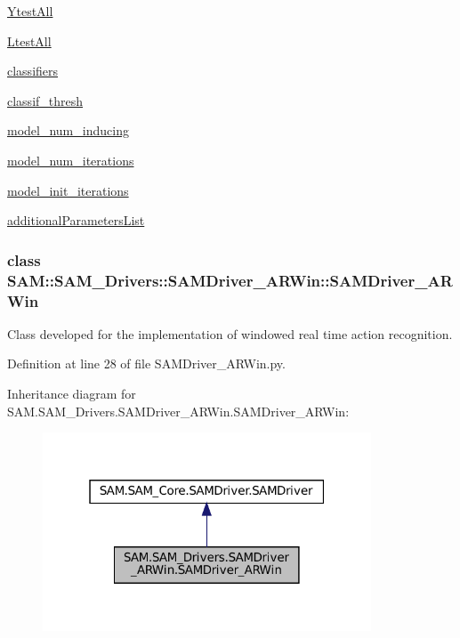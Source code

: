 \begin{DoxyCompactItemize}
\item 
\hyperlink{group__icubclient__SAM__Drivers_ga61bc4612a1dd3b5d593798bb7e338c81}{Ytest\+All}
\item 
\hyperlink{group__icubclient__SAM__Drivers_ga47bb2e79cf8b5f8e071ab6208cf25dd0}{Ltest\+All}
\item 
\hyperlink{group__icubclient__SAM__Drivers_gabe6b807db021be28e71f027af8123925}{classifiers}
\item 
\hyperlink{group__icubclient__SAM__Drivers_gac5a03c4fd8cc77e66e3b990cde23ce81}{classif\+\_\+thresh}
\item 
\hyperlink{group__icubclient__SAM__Drivers_ga3c0dc0cea69b59e7bf3e2bf21d098d7f}{model\+\_\+num\+\_\+inducing}
\item 
\hyperlink{group__icubclient__SAM__Drivers_gad641973a96f09f2047d0410e31bc609c}{model\+\_\+num\+\_\+iterations}
\item 
\hyperlink{group__icubclient__SAM__Drivers_ga058fd6bcc38278be395e94cad6db2729}{model\+\_\+init\+\_\+iterations}
\item 
\hyperlink{group__icubclient__SAM__Drivers_gaba1d7355c9842c5ea5881fc9926c06bf}{additional\+Parameters\+List}
\end{DoxyCompactItemize}
\label{classSAM_1_1SAM__Drivers_1_1SAMDriver__ARWin_1_1SAMDriver__ARWin}
\subsubsection{class S\+AM\+:\+:S\+A\+M\+\_\+\+Drivers\+:\+:S\+A\+M\+Driver\+\_\+\+A\+R\+Win\+:\+:S\+A\+M\+Driver\+\_\+\+A\+R\+Win}
Class developed for the implementation of windowed real time action recognition. 

Definition at line 28 of file S\+A\+M\+Driver\+\_\+\+A\+R\+Win.\+py.



Inheritance diagram for S\+A\+M.\+S\+A\+M\+\_\+\+Drivers.\+S\+A\+M\+Driver\+\_\+\+A\+R\+Win.\+S\+A\+M\+Driver\+\_\+\+A\+R\+Win\+:
\nopagebreak
\begin{figure}[H]
\begin{center}
\leavevmode
\includegraphics[width=277pt]{classSAM_1_1SAM__Drivers_1_1SAMDriver__ARWin_1_1SAMDriver__ARWin__inherit__graph}
\end{center}
\end{figure}
